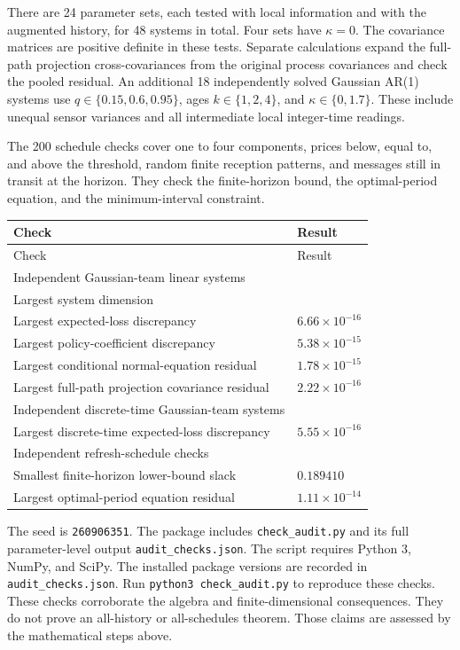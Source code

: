 \documentclass[11pt,letterpaper]{article}
\begin{document}
There are 24 parameter sets, each tested with local information and with the augmented history, for 48 systems in total. Four sets have $\kappa=0$. The covariance matrices are positive definite in these tests. Separate calculations expand the full-path projection cross-covariances from the original process covariances and check the pooled residual. An additional 18 independently solved Gaussian AR(1) systems use $q\in\{0.15,0.6,0.95\}$, ages $k\in\{1,2,4\}$, and $\kappa\in\{0,1.7\}$. These include unequal sensor variances and all intermediate local integer-time readings.

The 200 schedule checks cover one to four components, prices below, equal to, and above the threshold, random finite reception patterns, and messages still in transit at the horizon. They check the finite-horizon bound, the optimal-period equation, and the minimum-interval constraint.

{\small \begin{longtable}{>{\raggedright\arraybackslash}p{.66\linewidth}>{\raggedright\arraybackslash}p{.25\linewidth}}
\toprule
Check & Result \\
\midrule\endfirsthead
\toprule
Check & Result \\
\midrule\endhead
\bottomrule\endfoot
Independent Gaussian-team linear systems & 48 \\[3pt]
Largest system dimension & 126 \\[3pt]
Largest expected-loss discrepancy & $6.66\times10^{-16}$ \\[3pt]
Largest policy-coefficient discrepancy & $5.38\times10^{-15}$ \\[3pt]
Largest conditional normal-equation residual & $1.78\times10^{-15}$ \\[3pt]
Largest full-path projection covariance residual & $2.22\times10^{-16}$ \\[3pt]
Independent discrete-time Gaussian-team systems & 18 \\[3pt]
Largest discrete-time expected-loss discrepancy & $5.55\times10^{-16}$ \\[3pt]
Independent refresh-schedule checks & 200 \\[3pt]
Smallest finite-horizon lower-bound slack & $0.189410$ \\*[3pt]
Largest optimal-period equation residual & $1.11\times10^{-14}$ \\[3pt]
\end{longtable}}

The seed is \texttt{260906351}. The package includes \texttt{check\_audit.py} and its full parameter-level output \texttt{audit\_checks.json}. The script requires Python 3, NumPy, and SciPy. The installed package versions are recorded in \texttt{audit\_checks.json}. Run \texttt{python3 check\_audit.py} to reproduce these checks.
These checks corroborate the algebra and finite-dimensional consequences. They do not prove an all-history or all-schedules theorem. Those claims are assessed by the mathematical steps above.
\end{document}
